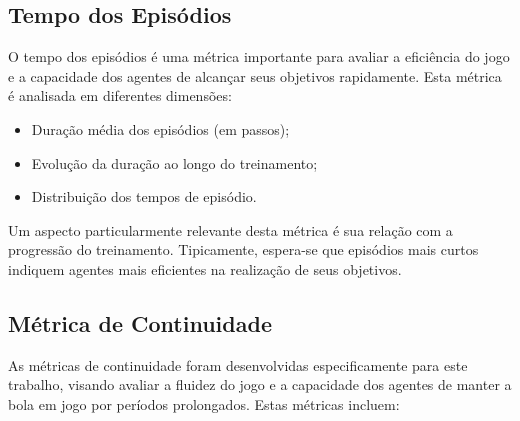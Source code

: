 


\subsection{Tempo dos Episódios}

O tempo dos episódios é uma métrica importante para avaliar a eficiência do jogo e a capacidade dos agentes de alcançar seus objetivos rapidamente. Esta métrica é analisada em diferentes dimensões:

\begin{itemize}
    \item Duração média dos episódios (em passos);
    \item Evolução da duração ao longo do treinamento;
    \item Distribuição dos tempos de episódio.
\end{itemize}

Um aspecto particularmente relevante desta métrica é sua relação com a progressão do treinamento. Tipicamente, espera-se que episódios mais curtos indiquem agentes mais eficientes na realização de seus objetivos.

\subsection{Métrica de Continuidade}

As métricas de continuidade foram desenvolvidas especificamente para este trabalho, visando avaliar a fluidez do jogo e a capacidade dos agentes de manter a bola em jogo por períodos prolongados. Estas métricas incluem:

